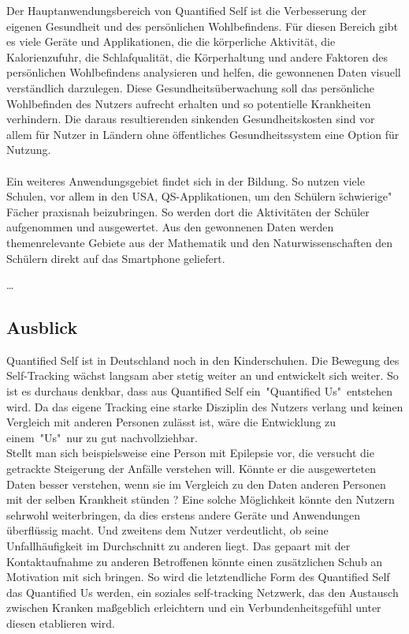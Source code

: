 Der Hauptanwendungsbereich von Quantified Self ist die Verbesserung der eigenen Gesundheit und des persönlichen Wohlbefindens. 
Für diesen Bereich gibt es viele Geräte und Applikationen, die die körperliche Aktivität, die Kalorienzufuhr, die Schlafqualität, die Körperhaltung und andere Faktoren des persönlichen Wohlbefindens analysieren und helfen, die gewonnenen Daten visuell verständlich darzulegen. 
Diese Gesundheitsüberwachung soll das persönliche Wohlbefinden des Nutzers aufrecht erhalten und so potentielle Krankheiten verhindern.
Die daraus resultierenden sinkenden Gesundheitskosten sind vor allem für Nutzer in Ländern ohne öffentliches Gesundheitssystem eine Option für Nutzung.
\\
\\
Ein weiteres Anwendungsgebiet findet sich in der Bildung. 
So nutzen viele Schulen, vor allem in den USA, QS-Applikationen, um den Schülern \"schwierige" Fächer praxisnah beizubringen. 
So werden dort die Aktivitäten der Schüler aufgenommen und ausgewertet.
Aus den gewonnenen Daten werden themenrelevante Gebiete aus der Mathematik und den Naturwissenschaften den Schülern direkt auf das Smartphone geliefert. 

\ldots 


\subsection{Ausblick}
\label{ch:Grundlagen:sec:Quantified Self:subsec:Ausblick}

Quantified Self ist in Deutschland noch in den Kinderschuhen.
Die Bewegung des Self-Tracking wächst langsam aber stetig weiter an und entwickelt sich weiter.
So ist es durchaus denkbar, dass aus Quantified Self  ein\ "Quantified Us"\ entstehen wird.
Da das eigene Tracking eine starke Disziplin des Nutzers verlang und keinen Vergleich mit anderen Personen zulässt ist, wäre die Entwicklung zu einem\ "Us"\ nur zu gut nachvollziehbar.
\\
Stellt man sich beispielsweise eine Person mit Epilepsie vor, die versucht die getrackte Steigerung der Anfälle verstehen will. 
Könnte er die ausgewerteten Daten besser verstehen, wenn sie im Vergleich zu den Daten anderen Personen mit der selben Krankheit stünden ? 
Eine solche Möglichkeit könnte den Nutzern sehrwohl weiterbringen, da dies erstens andere Geräte und Anwendungen überflüssig macht. 
Und zweitens dem Nutzer verdeutlicht, ob seine Unfallhäufigkeit im Durchschnitt zu anderen liegt.
Das gepaart mit der Kontaktaufnahme zu anderen Betroffenen könnte einen zusätzlichen Schub an Motivation mit sich bringen. 
So wird die letztendliche Form des Quantified Self das Quantified Us werden, ein soziales self-tracking Netzwerk, das den Austausch zwischen Kranken maßgeblich erleichtern  und ein Verbundenheitsgefühl unter diesen etablieren wird.


